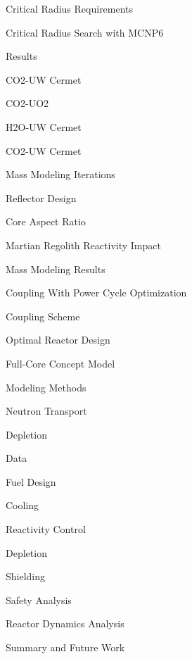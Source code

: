 \documentclass{report}
\begin{document}
\begin{outline}
\begin{outline}
\begin{outline}
          \end{outline}
      \item { Critical Radius Requirements }
          \begin{outline}
          \item { Critical Radius Search with MCNP6}
          \item { Results }
              \begin{outline}
              \item {CO2-UW Cermet}
              \item {CO2-UO2}
              \item {H2O-UW Cermet}
              \item {CO2-UW Cermet}
              \end{outline}
          \end{outline}
          \item { Mass Modeling Iterations }
              \begin{outline}
              \item { Reflector Design }
              \item { Core Aspect Ratio }
              \item { Martian Regolith Reactivity Impact }
              \end{outline}
          \item { Mass Modeling Results }
      \end{outline}
  \item { Coupling With Power Cycle Optimization }
        \begin{outline}
        \item { Coupling Scheme }
        \item { Optimal Reactor Design }
        \end{outline}
  \item { Full-Core Concept Model }
        \begin{outline}
        \item { Modeling Methods }
            \begin{outline}
            \item { Neutron Transport }
            \item { Depletion }
            \item { Data }
            \end{outline}
        \item { Fuel Design }
        \item { Cooling }
        \item { Reactivity Control }
        \item { Depletion }
        \item { Shielding }
        \item { Safety Analysis }
        \item { Reactor Dynamics Analysis }
        \end{outline}
  \item { Summary and Future Work }
\end{outline}
\end{document}
